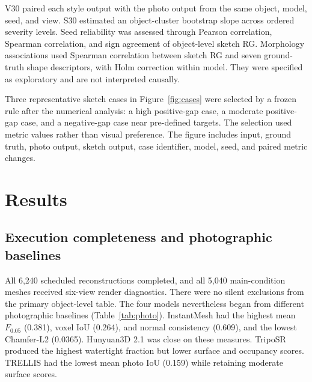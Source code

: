 \documentclass[12pt,a4paper]{article}
\begin{document}
V30 paired each style output with the photo output from the same object, model, seed, and view. S30 estimated an object-cluster bootstrap slope across ordered severity levels. Seed reliability was assessed through Pearson correlation, Spearman correlation, and sign agreement of object-level sketch RG. Morphology associations used Spearman correlation between sketch RG and seven ground-truth shape descriptors, with Holm correction within model. They were specified as exploratory and are not interpreted causally.

Three representative sketch cases in Figure~\ref{fig:cases} were selected by a frozen rule after the numerical analysis: a high positive-gap case, a moderate positive-gap case, and a negative-gap case near pre-defined targets. The selection used metric values rather than visual preference. The figure includes input, ground truth, photo output, sketch output, case identifier, model, seed, and paired metric changes.

\section{Results}

\subsection{Execution completeness and photographic baselines}

All 6,240 scheduled reconstructions completed, and all 5,040 main-condition meshes received six-view render diagnostics. There were no silent exclusions from the primary object-level table. The four models nevertheless began from different photographic baselines (Table~\ref{tab:photo}). InstantMesh had the highest mean $F_{0.05}$ (0.381), voxel IoU (0.264), and normal consistency (0.609), and the lowest Chamfer-L2 (0.0365). Hunyuan3D 2.1 was close on these measures. TripoSR produced the highest watertight fraction but lower surface and occupancy scores. TRELLIS had the lowest mean photo IoU (0.159) while retaining moderate surface scores.
\end{document}
